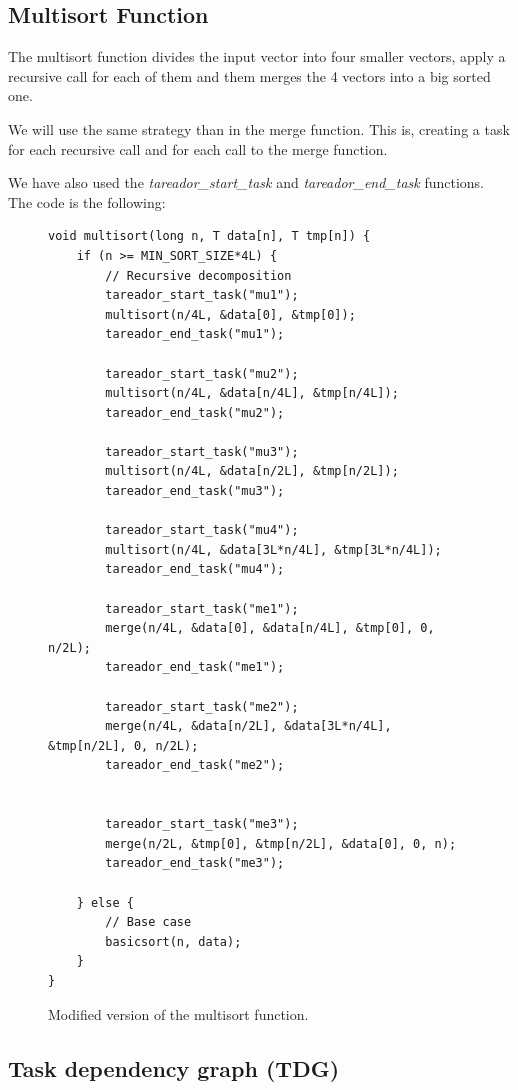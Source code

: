 \documentclass[12pt, a4paper]{article}
\begin{document}
\subsection{Multisort Function}

The multisort function divides the input vector into four smaller vectors, apply a recursive call for each of them and them merges the 4 vectors into a big sorted one.

We will use the same strategy than in the merge function. This is, creating a task for each recursive call and for each call to the merge function.

We have also used the \textit{tareador\_start\_task} and \textit{tareador\_end\_task} functions. The code is the following:

\begin{figure}[H]
\begin{lstlisting}
void multisort(long n, T data[n], T tmp[n]) {
    if (n >= MIN_SORT_SIZE*4L) {
        // Recursive decomposition
        tareador_start_task("mu1");
        multisort(n/4L, &data[0], &tmp[0]);
        tareador_end_task("mu1");

        tareador_start_task("mu2");
        multisort(n/4L, &data[n/4L], &tmp[n/4L]);
        tareador_end_task("mu2");

        tareador_start_task("mu3");
        multisort(n/4L, &data[n/2L], &tmp[n/2L]);
        tareador_end_task("mu3");

        tareador_start_task("mu4");
        multisort(n/4L, &data[3L*n/4L], &tmp[3L*n/4L]);
        tareador_end_task("mu4");

        tareador_start_task("me1");
        merge(n/4L, &data[0], &data[n/4L], &tmp[0], 0, n/2L);
        tareador_end_task("me1");

        tareador_start_task("me2");
        merge(n/4L, &data[n/2L], &data[3L*n/4L], &tmp[n/2L], 0, n/2L);
        tareador_end_task("me2");


        tareador_start_task("me3");
        merge(n/2L, &tmp[0], &tmp[n/2L], &data[0], 0, n);
        tareador_end_task("me3");

    } else {
        // Base case
        basicsort(n, data);
    }
}
\end{lstlisting}

\label{code:multisort_tareador}
\caption{Modified version of the multisort function.}
\end{figure}

\subsection{Task dependency graph (TDG)}
\end{document}
